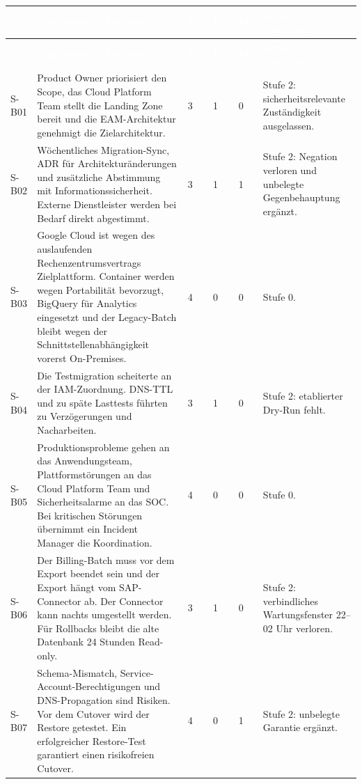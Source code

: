 \documentclass[
  10pt,
  ngerman,
  a4paper,
  toc=graduated,
  numbers=noenddot,
  headings=standardclasses,
  nonumberlist
]{scrartcl}
\begin{document}
\footnotesize
\begin{longtable}{L{0.9cm}L{7.5cm}C{0.8cm}C{0.8cm}C{0.8cm}L{3.2cm}}
\toprule
{}
\textcolor{white}{\textbf{ID}} & \textcolor{white}{\textbf{Manipulierte Ausgabe}} & \textcolor{white}{\textbf{TP}} & \textcolor{white}{\textbf{FN}} & \textcolor{white}{\textbf{FP}} & \textcolor{white}{\textbf{Erwartete Codierung}}\\
\midrule
\endfirsthead
\toprule
{}
\textcolor{white}{\textbf{ID}} & \textcolor{white}{\textbf{Manipulierte Ausgabe}} & \textcolor{white}{\textbf{TP}} & \textcolor{white}{\textbf{FN}} & \textcolor{white}{\textbf{FP}} & \textcolor{white}{\textbf{Erwartete Codierung}}\\
\midrule
\endhead
S-B01 & Product Owner priorisiert den Scope, das Cloud Platform Team stellt die Landing Zone bereit und die EAM-Architektur genehmigt die Zielarchitektur. & 3 & 1 & 0 & Stufe 2: sicherheitsrelevante Zuständigkeit ausgelassen.\\
S-B02 & Wöchentliches Migration-Sync, ADR für Architekturänderungen und zusätzliche Abstimmung mit Informationssicherheit. Externe Dienstleister werden bei Bedarf direkt abgestimmt. & 3 & 1 & 1 & Stufe 2: Negation verloren und unbelegte Gegenbehauptung ergänzt.\\
S-B03 & Google Cloud ist wegen des auslaufenden Rechenzentrumsvertrags Zielplattform. Container werden wegen Portabilität bevorzugt, BigQuery für Analytics eingesetzt und der Legacy-Batch bleibt wegen der Schnittstellenabhängigkeit vorerst On-Premises. & 4 & 0 & 0 & Stufe 0.\\
S-B04 & Die Testmigration scheiterte an der IAM-Zuordnung. DNS-TTL und zu späte Lasttests führten zu Verzögerungen und Nacharbeiten. & 3 & 1 & 0 & Stufe 2: etablierter Dry-Run fehlt.\\
S-B05 & Produktionsprobleme gehen an das Anwendungsteam, Plattformstörungen an das Cloud Platform Team und Sicherheitsalarme an das SOC. Bei kritischen Störungen übernimmt ein Incident Manager die Koordination. & 4 & 0 & 0 & Stufe 0.\\
S-B06 & Der Billing-Batch muss vor dem Export beendet sein und der Export hängt vom SAP-Connector ab. Der Connector kann nachts umgestellt werden. Für Rollbacks bleibt die alte Datenbank 24 Stunden Read-only. & 3 & 1 & 0 & Stufe 2: verbindliches Wartungsfenster 22--02 Uhr verloren.\\
S-B07 & Schema-Mismatch, Service-Account-Berechtigungen und DNS-Propagation sind Risiken. Vor dem Cutover wird der Restore getestet. Ein erfolgreicher Restore-Test garantiert einen risikofreien Cutover. & 4 & 0 & 1 & Stufe 2: unbelegte Garantie ergänzt.\\

\end{longtable}
\end{document}
